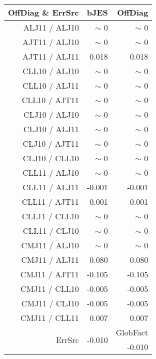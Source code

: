 \begin{table}[H]
\scriptsize
\begin{center}
\renewcommand{\arraystretch}{1.1}
\begin{tabular}{|r|r|r|}
\hline
 OffDiag \& ErrSrc & {\tiny bJES} & OffDiag\\
\hline
ALJ11 / ALJ10 &  {\tiny $\sim$ }0 &  {\tiny $\sim$ }0 \\
AJT11 / ALJ10 &  {\tiny $\sim$ }0 &  {\tiny $\sim$ }0 \\
AJT11 / ALJ11 &      0.018 &      0.018 \\
CLL10 / ALJ10 &  {\tiny $\sim$ }0 &  {\tiny $\sim$ }0 \\
CLL10 / ALJ11 &  {\tiny $\sim$ }0 &  {\tiny $\sim$ }0 \\
CLL10 / AJT11 &  {\tiny $\sim$ }0 &  {\tiny $\sim$ }0 \\
CLJ10 / ALJ10 &  {\tiny $\sim$ }0 &  {\tiny $\sim$ }0 \\
CLJ10 / ALJ11 &  {\tiny $\sim$ }0 &  {\tiny $\sim$ }0 \\
CLJ10 / AJT11 &  {\tiny $\sim$ }0 &  {\tiny $\sim$ }0 \\
CLJ10 / CLL10 &  {\tiny $\sim$ }0 &  {\tiny $\sim$ }0 \\
CLL11 / ALJ10 &  {\tiny $\sim$ }0 &  {\tiny $\sim$ }0 \\
CLL11 / ALJ11 &     -0.001 &     -0.001 \\
CLL11 / AJT11 &      0.001 &      0.001 \\
CLL11 / CLL10 &  {\tiny $\sim$ }0 &  {\tiny $\sim$ }0 \\
CLL11 / CLJ10 &  {\tiny $\sim$ }0 &  {\tiny $\sim$ }0 \\
CMJ11 / ALJ10 &  {\tiny $\sim$ }0 &  {\tiny $\sim$ }0 \\
CMJ11 / ALJ11 &  \colorbox{Yellow1}{    0.080} &  \colorbox{Yellow1}{    0.080} \\
CMJ11 / AJT11 &     -0.105 &     -0.105 \\
CMJ11 / CLL10 &     -0.005 &     -0.005 \\
CMJ11 / CLJ10 &     -0.005 &     -0.005 \\
CMJ11 / CLL11 &      0.007 &      0.007 \\
\hline
\multirow{2}{*}{ErrSrc} & \multirow{2}{*}{    -0.010} & GlobFact\\
 & &     -0.010 \\
\hline
\end{tabular}
\renewcommand{\arraystretch}{1}

\end{center}
\end{table}
